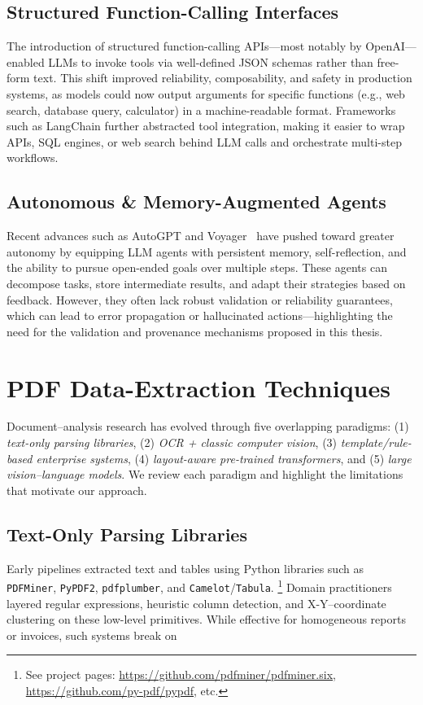 \subsection{Structured Function-Calling Interfaces}
The introduction of structured function-calling APIs—most notably by OpenAI—enabled LLMs to invoke tools via well-defined JSON schemas rather than free-form text. This shift improved reliability, composability, and safety in production systems, as models could now output arguments for specific functions (e.g., web search, database query, calculator) in a machine-readable format. Frameworks such as LangChain further abstracted tool integration, making it easier to wrap APIs, SQL engines, or web search behind LLM calls and orchestrate multi-step workflows.

\subsection{Autonomous \& Memory-Augmented Agents}
Recent advances such as AutoGPT and Voyager~\cite{wang2023voyager} have pushed toward greater autonomy by equipping LLM agents with persistent memory, self-reflection, and the ability to pursue open-ended goals over multiple steps. These agents can decompose tasks, store intermediate results, and adapt their strategies based on feedback. However, they often lack robust validation or reliability guarantees, which can lead to error propagation or hallucinated actions—highlighting the need for the validation and provenance mechanisms proposed in this thesis.

\section{PDF Data-Extraction Techniques}
Document–analysis research has evolved through five overlapping paradigms:  
(1) \emph{text-only parsing libraries},  
(2) \emph{OCR + classic computer vision},  
(3) \emph{template/rule-based enterprise systems},  
(4) \emph{layout-aware pre-trained transformers}, and  
(5) \emph{large vision--language models}.  
We review each paradigm and highlight the limitations that motivate our approach.

\subsection{Text-Only Parsing Libraries}
Early pipelines extracted text and tables using Python libraries such as
\texttt{PDFMiner}, \texttt{PyPDF2}, \texttt{pdfplumber}, and
\texttt{Camelot}/\texttt{Tabula}.%
\footnote{See project pages: \url{https://github.com/pdfminer/pdfminer.six},
\url{https://github.com/py-pdf/pypdf}, etc.}  
Domain practitioners layered regular expressions, heuristic column detection,
and X-Y–coordinate clustering on these low-level primitives.
While effective for homogeneous reports or invoices, such systems break on

